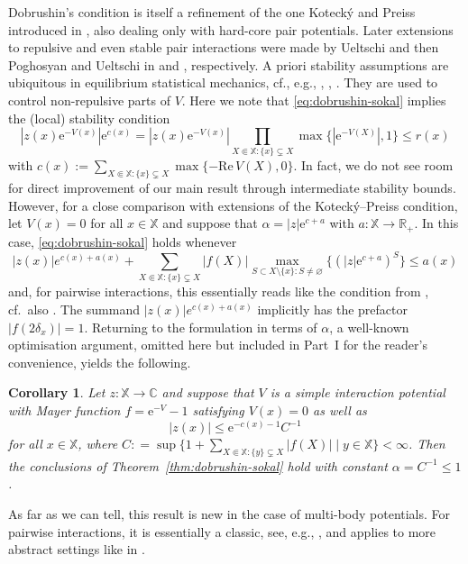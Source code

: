 \documentclass[10pt,a4paper]{amsart}
\newtheorem{cor}[theorem]{Corollary}
\newcommand{\e}{\mathrm{e}}
\newcommand{\R}{\mathbb{R}}
\newcommand{\C}{\mathbb{C}}
\newcommand{\X}{\mathbb X}
\renewcommand{\Re}{\mathrm{Re}\,}
\begin{document}
Dobrushin's condition is itself a refinement of the one Koteck{\'y} and Preiss introduced in \cite{ref:kotecky-preiss}, also dealing only with hard-core pair potentials. 
Later extensions to repulsive and even stable pair interactions were made by Ueltschi and then Poghosyan and Ueltschi in \cite{ref:ueltschi} and \cite{ref:poghosyan-ueltschi}, respectively. 
A priori stability assumptions are ubiquitous in equilibrium statistical mechanics, cf., e.g., \cite{ref:ruelle}, \cite{ref:gallavotti-miracle-sole, ref:gallavotti-miracle-sole-robinson}, \cite{ref:poghosyan-ueltschi, ref:procacci-yuhjtman, ref:jansen-cluster, ref:jansen-kolesnikov}. 
They are used to control non-repulsive parts of $V$. 
Here we note that \eqref{eq:dobrushin-sokal} implies the (local) stability condition
\[
	|z(x) \e^{-V(x)}| \e^{c(x)} = |z(x) \e^{-V(x)}| \prod_{X \Subset \X : \{x\} \subsetneq X} \max\{|\e^{-V(X)}|, 1\} \leq r(x)
\]
with $c(x) := \sum_{X \Subset \X : \{x\} \subsetneq X} \max\{-\Re V(X), 0\}$. 
In fact, we do not see room for direct improvement of our main result through intermediate stability bounds. 
However, for a close comparison with extensions of the Koteck{\'y}--Preiss condition, let $V(x) = 0$ for all $x \in \X$ and suppose that $\alpha = |z| \e^{c + a}$ with $a : \X\to\R_+$. 
In this case, \eqref{eq:dobrushin-sokal} holds whenever
\[
	|z(x)| e^{c(x) + a(x)} + \sum_{X \Subset \X : \{x\} \subsetneq X} |f(X)| \max_{S \subset X \setminus \{x\} : S \neq \varnothing}\{ (|z| \e^{c + a})^S\} \leq a(x)
\]
and, for pairwise interactions, this essentially reads like the condition from \cite{ref:poghosyan-ueltschi}, cf.\ also \cite{ref:jansen-kolesnikov}. 
The summand $|z(x)| e^{c(x)+a(x)}$ implicitly has the prefactor $|f(2\delta_x)| = 1$. 
Returning to the formulation in terms of $\alpha$, a well-known optimisation argument, omitted here but included in Part~I for the reader's convenience, yields the following.

\begin{cor}
	Let $z : \X \to \C$ and suppose that $V$ is a simple interaction potential with Mayer function $f = \e^{-V} - 1$ satisfying $V(x)=0$ as well as
	\[
		|z(x)| \leq \e^{-c(x)-1} C^{-1}
	\]
	for all $x \in \X$, where $C : = \sup\{1 + \sum_{X \Subset \X : \{y\} \subsetneq X} |f(X)| \mid y \in \X\} < \infty$. Then the conclusions of Theorem~\ref{thm:dobrushin-sokal} hold with constant $\alpha = C^{-1} \leq 1$.
\end{cor}

As far as we can tell, this result is new in the case of multi-body potentials. 
For pairwise interactions, it is essentially a classic, see, e.g., \cite{ref:ruelle}, and applies to more abstract settings like in \cite{ref:poghosyan-ueltschi, ref:jansen-kolesnikov}.
\end{document}
